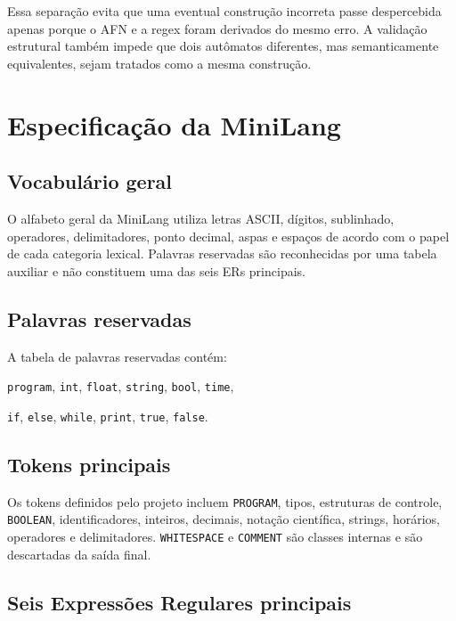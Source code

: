 \documentclass[12pt,a4paper,oneside]{report}
\begin{document}
Essa separação evita que uma eventual construção incorreta passe despercebida apenas porque o AFN e a regex foram derivados do mesmo erro. A validação estrutural também impede que dois autômatos diferentes, mas semanticamente equivalentes, sejam tratados como a mesma construção.



\chapter{Especificação da MiniLang}

\section{Vocabulário geral}

O alfabeto geral da MiniLang utiliza letras ASCII, dígitos, sublinhado, operadores, delimitadores, ponto decimal, aspas e espaços de acordo com o papel de cada categoria lexical. Palavras reservadas são reconhecidas por uma tabela auxiliar e não constituem uma das seis ERs principais.

\section{Palavras reservadas}

A tabela de palavras reservadas contém:

\begin{center}
\texttt{program}, \texttt{int}, \texttt{float}, \texttt{string}, \texttt{bool}, \texttt{time},

\texttt{if}, \texttt{else}, \texttt{while}, \texttt{print}, \texttt{true}, \texttt{false}.
\end{center}

\section{Tokens principais}

Os tokens definidos pelo projeto incluem \texttt{PROGRAM}, tipos, estruturas de controle, \texttt{BOOLEAN}, identificadores, inteiros, decimais, notação científica, strings, horários, operadores e delimitadores. \texttt{WHITESPACE} e \texttt{COMMENT} são classes internas e são descartadas da saída final.

\section{Seis Expressões Regulares principais}
\end{document}
